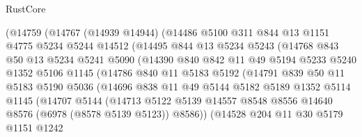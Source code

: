 \begin{lexlean}{RustCore}
\begin{coremodule}
              (@14759
                (@14767
                  (@14939 @14944)
                  (@14486
                    @5100
                    @311
                    @844
                    @13
                    @1151
                    @4775
                    @5234
                    @5244
                    @14512
                    (@14495
                      @844
                      @13
                      @5234
                      @5243
                      (@14768
                        @843
                        @50
                        @13
                        @5234
                        @5241
                        @5090
                        (@14390
                          @840
                          @842
                          @11
                          @49
                          @5194
                          @5233
                          @5240
                          @1352
                          @5106
                          @1145
                          (@14786
                            @840
                            @11
                            @5183
                            @5192
                            (@14791
                              @839
                              @50
                              @11
                              @5183
                              @5190
                              @5036
                              (@14696
                                @838
                                @11
                                @49
                                @5144
                                @5182
                                @5189
                                @1352
                                @5114
                                @1145
                                (@14707
                                  @5144
                                  (@14713
                                    @5122
                                    @5139
                                    @14557
                                    @8548
                                    @8556
                                    @14640
                                    @8576
                                    (@6978 (@8578 @5139 @5123))
                                    @8586))
                                (@14528
                                  @204
                                  @11
                                  @30
                                  @5179
                                  @1151
                                  @1242

\end{coremodule}
\end{lexlean}
